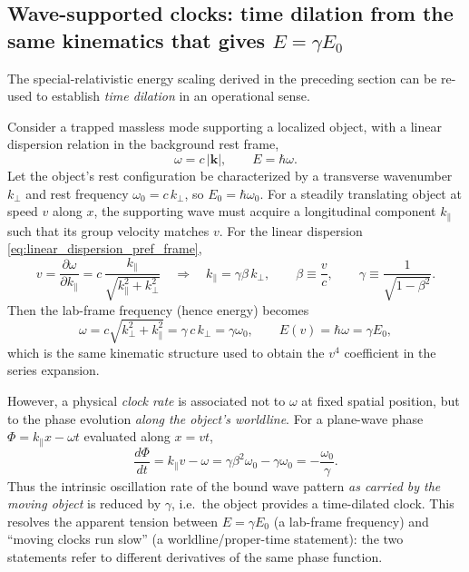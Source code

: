 \documentclass[11pt]{article}
\begin{document}
\subsection{Wave-supported clocks: time dilation from the same kinematics that gives $E=\gamma E_0$}
\label{sec:preferred_frame_time_dilation}

The special-relativistic energy scaling derived in the preceding section can be
re-used to establish \emph{time dilation} in an operational sense.

Consider a trapped massless mode supporting a localized object, with a linear
dispersion relation in the background rest frame,
\begin{equation}
\omega = c\,|\mathbf k|, \qquad E=\hbar\omega.
\label{eq:linear_dispersion_pref_frame}
\end{equation}
Let the object's rest configuration be characterized by a transverse wavenumber
$k_\perp$ and rest frequency $\omega_0=c\,k_\perp$, so $E_0=\hbar\omega_0$.
For a steadily translating object at speed $v$ along $x$, the supporting wave must
acquire a longitudinal component $k_\parallel$ such that its group velocity matches $v$.
For the linear dispersion \eqref{eq:linear_dispersion_pref_frame},
\begin{equation}
v = \frac{\partial \omega}{\partial k_\parallel}
= c\,\frac{k_\parallel}{\sqrt{k_\parallel^2+k_\perp^2}}
\quad\Longrightarrow\quad
k_\parallel = \gamma\beta\,k_\perp,
\qquad
\beta\equiv \frac{v}{c},
\qquad
\gamma \equiv \frac{1}{\sqrt{1-\beta^2}}.
\label{eq:k_parallel_condition_pref_frame}
\end{equation}
Then the lab-frame frequency (hence energy) becomes
\begin{equation}
\omega = c\sqrt{k_\perp^2+k_\parallel^2} = \gamma\,c\,k_\perp = \gamma\omega_0,
\qquad
E(v)=\hbar\omega = \gamma E_0,
\label{eq:E_gamma_pref_frame}
\end{equation}
which is the same kinematic structure used to obtain the $v^4$ coefficient in the
series expansion.

However, a physical \emph{clock rate} is associated not to $\omega$ at fixed spatial
position, but to the phase evolution \emph{along the object's worldline}.
For a plane-wave phase $\Phi = k_\parallel x - \omega t$ evaluated along $x=vt$,
\begin{equation}
\frac{d\Phi}{dt} = k_\parallel v - \omega
= \gamma\beta^2\omega_0 - \gamma\omega_0
= -\frac{\omega_0}{\gamma}.
\label{eq:phase_rate_worldline_pref_frame}
\end{equation}
Thus the intrinsic oscillation rate of the bound wave pattern \emph{as carried by the moving
object} is reduced by $\gamma$, i.e.\ the object provides a time-dilated clock.
This resolves the apparent tension between $E=\gamma E_0$ (a lab-frame frequency)
and ``moving clocks run slow'' (a worldline/proper-time statement): the two statements
refer to different derivatives of the same phase function.
\end{document}
